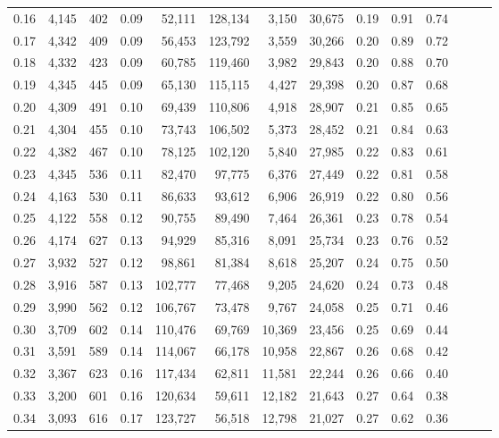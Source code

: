 \begin{tabular}{rrrrrrrrrrrrrr}
0.16 &  4,145 &  402 &  0.09 &   52,111 &  128,134 &   3,150 &  30,675 &  0.19 &  0.91 &      0.74 \\
0.17 &  4,342 &  409 &  0.09 &   56,453 &  123,792 &   3,559 &  30,266 &  0.20 &  0.89 &      0.72 \\
0.18 &  4,332 &  423 &  0.09 &   60,785 &  119,460 &   3,982 &  29,843 &  0.20 &  0.88 &      0.70 \\
0.19 &  4,345 &  445 &  0.09 &   65,130 &  115,115 &   4,427 &  29,398 &  0.20 &  0.87 &      0.68 \\
0.20 &  4,309 &  491 &  0.10 &   69,439 &  110,806 &   4,918 &  28,907 &  0.21 &  0.85 &      0.65 \\
0.21 &  4,304 &  455 &  0.10 &   73,743 &  106,502 &   5,373 &  28,452 &  0.21 &  0.84 &      0.63 \\
0.22 &  4,382 &  467 &  0.10 &   78,125 &  102,120 &   5,840 &  27,985 &  0.22 &  0.83 &      0.61 \\
0.23 &  4,345 &  536 &  0.11 &   82,470 &   97,775 &   6,376 &  27,449 &  0.22 &  0.81 &      0.58 \\
0.24 &  4,163 &  530 &  0.11 &   86,633 &   93,612 &   6,906 &  26,919 &  0.22 &  0.80 &      0.56 \\
0.25 &  4,122 &  558 &  0.12 &   90,755 &   89,490 &   7,464 &  26,361 &  0.23 &  0.78 &      0.54 \\
0.26 &  4,174 &  627 &  0.13 &   94,929 &   85,316 &   8,091 &  25,734 &  0.23 &  0.76 &      0.52 \\
0.27 &  3,932 &  527 &  0.12 &   98,861 &   81,384 &   8,618 &  25,207 &  0.24 &  0.75 &      0.50 \\
0.28 &  3,916 &  587 &  0.13 &  102,777 &   77,468 &   9,205 &  24,620 &  0.24 &  0.73 &      0.48 \\
0.29 &  3,990 &  562 &  0.12 &  106,767 &   73,478 &   9,767 &  24,058 &  0.25 &  0.71 &      0.46 \\
0.30 &  3,709 &  602 &  0.14 &  110,476 &   69,769 &  10,369 &  23,456 &  0.25 &  0.69 &      0.44 \\
0.31 &  3,591 &  589 &  0.14 &  114,067 &   66,178 &  10,958 &  22,867 &  0.26 &  0.68 &      0.42 \\
0.32 &  3,367 &  623 &  0.16 &  117,434 &   62,811 &  11,581 &  22,244 &  0.26 &  0.66 &      0.40 \\
0.33 &  3,200 &  601 &  0.16 &  120,634 &   59,611 &  12,182 &  21,643 &  0.27 &  0.64 &      0.38 \\
0.34 &  3,093 &  616 &  0.17 &  123,727 &   56,518 &  12,798 &  21,027 &  0.27 &  0.62 &      0.36 \\

\end{tabular}
